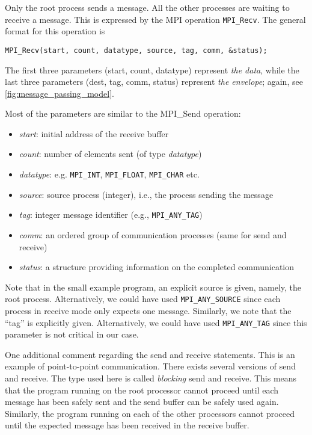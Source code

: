 Only the root process sends a message. All the other processes are waiting to
receive a message. This is expressed by the MPI operation \texttt{MPI\_Recv}.
The general format for this operation is
\begin{lstlisting}[style=c]
  MPI_Recv(start, count, datatype, source, tag, comm, &status);
\end{lstlisting}
The first three parameters (start, count, datatype) represent \emph{the data},
while the last three parameters (dest, tag, comm, status) represent \emph{the
envelope}; again, see \autoref{fig:message_passing_model}.

Most of the parameters are similar to the MPI\_Send operation:
\begin{itemize}
\item \emph{start}: initial address of the receive buffer
\item \emph{count}: number of elements sent (of type \emph{datatype})
\item \emph{datatype}: e.g. \texttt{MPI\_INT}, \texttt{MPI\_FLOAT}, \texttt{MPI\_CHAR} etc.
\item \emph{source}: source process (integer), i.e., the process sending the message
\item \emph{tag}: integer message identifier (e.g., \texttt{MPI\_ANY\_TAG})
\item \emph{comm}: an ordered group of communication processes (same for send and receive)
\item \emph{status}: a structure providing information on the completed communication
\end{itemize}

Note that in the small example program, an explicit source is given, namely, the
root process. Alternatively, we could have used \texttt{MPI\_ANY\_SOURCE} since
each process in receive mode only expects one message. Similarly, we note that
the ``tag'' is explicitly given. Alternatively, we could have used
\texttt{MPI\_ANY\_TAG} since this parameter is not critical in our case.

One additional comment regarding the send and receive statements. This is an
example of point-to-point communication. There exists several versions of send
and receive. The type used here is called \emph{blocking} send and receive. This
means that the program running on the root processor cannot proceed until each
message has been safely sent and the send buffer can be safely used again.
Similarly, the program running on each of the other processors cannot proceed
until the expected message has been received in the receive buffer.

